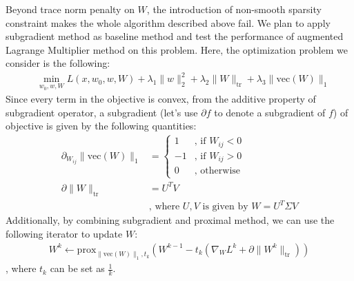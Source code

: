 \documentclass{article}
\newcommand{\tr}{\text{tr}}
\newcommand{\prox}{\text{prox}}
\newcommand{\vecc}{\text{vec}}
\begin{document}
Beyond trace norm penalty on $W$, the introduction of non-smooth sparsity constraint makes the whole algorithm described above fail. We plan to apply subgradient method as baseline method and test the performance of augmented Lagrange Multiplier method on this problem. Here, the optimization problem we consider is the following:
\begin{align}
  &\min_{w_0, w, W} L(x, w_0, w, W) + \lambda_1 \|w\|_2^2 + \lambda_2 \|W\|_{\tr} + \lambda_3 \|\vecc(W)\|_1 \label{eq:cfm}
\end{align}
Since every term in the objective is convex, from the additive property of subgradient operator, a subgradient (let’s use $\partial f$ to denote a subgradient of $f$) of objective is given by the following quantities:
\begin{align}
  \partial_{W_{ij}} \|\vecc(W)\|_1 &= \begin{cases}
    1 & \text{, if $W_{ij} < 0$} \nonumber \\
    -1 & \text{, if $W_{ij} > 0$} \nonumber \\
    0 & \text{, otherwise} 
\end{cases} \\
  \partial \|W\|_{\tr} &= U^TV \nonumber \\
  & \text{, where $U, V$ is given by $W = U^T \Sigma V$} \nonumber
\end{align}
Additionally, by combining subgradient and proximal method, we can use the following iterator to update $W$:
\begin{align*}
  W^k \leftarrow \prox_{\|\vecc(W)\|_1, t_k}(W^{k-1} -t_k (\nabla_W L^k + \partial \|W^k\|_{\tr}))
\end{align*}
, where $t_k$ can be set as $\frac{1}{k}$.
\end{document}
